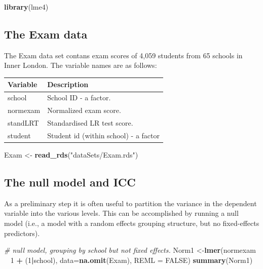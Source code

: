 \documentclass[]{book}
\newenvironment{Shaded}{\begin{snugshade}}{\end{snugshade}}
\newcommand{\KeywordTok}[1]{\textcolor[rgb]{0.13,0.29,0.53}{\textbf{#1}}}
\newcommand{\DataTypeTok}[1]{\textcolor[rgb]{0.13,0.29,0.53}{#1}}
\newcommand{\DecValTok}[1]{\textcolor[rgb]{0.00,0.00,0.81}{#1}}
\newcommand{\StringTok}[1]{\textcolor[rgb]{0.31,0.60,0.02}{#1}}
\newcommand{\CommentTok}[1]{\textcolor[rgb]{0.56,0.35,0.01}{\textit{#1}}}
\newcommand{\OtherTok}[1]{\textcolor[rgb]{0.56,0.35,0.01}{#1}}
\newcommand{\OperatorTok}[1]{\textcolor[rgb]{0.81,0.36,0.00}{\textbf{#1}}}
\newcommand{\NormalTok}[1]{#1}
\begin{document}
\begin{Shaded}
\begin{Highlighting}[]
  \KeywordTok{library}\NormalTok{(lme4)}
\end{Highlighting}
\end{Shaded}

\subsection{The Exam data}\label{the-exam-data}

The Exam data set contans exam scores of 4,059 students from 65 schools
in Inner London. The variable names are as follows:

\begin{longtable}[]{@{}ll@{}}
\toprule
Variable & Description\tabularnewline
\midrule
\endhead
school & School ID - a factor.\tabularnewline
normexam & Normalized exam score.\tabularnewline
standLRT & Standardised LR test score.\tabularnewline
student & Student id (within school) - a factor\tabularnewline
\bottomrule
\end{longtable}

\begin{Shaded}
\begin{Highlighting}[]
\NormalTok{  Exam <-}\StringTok{ }\KeywordTok{read_rds}\NormalTok{(}\StringTok{"dataSets/Exam.rds"}\NormalTok{)}
\end{Highlighting}
\end{Shaded}

\subsection{The null model and ICC}\label{the-null-model-and-icc}

As a preliminary step it is often useful to partition the variance in
the dependent variable into the various levels. This can be accomplished
by running a null model (i.e., a model with a random effects grouping
structure, but no fixed-effects predictors).

\begin{Shaded}
\begin{Highlighting}[]
  \CommentTok{# null model, grouping by school but not fixed effects.}
\NormalTok{  Norm1 <-}\KeywordTok{lmer}\NormalTok{(normexam }\OperatorTok{~}\StringTok{ }\DecValTok{1} \OperatorTok{+}\StringTok{ }\NormalTok{(}\DecValTok{1}\OperatorTok{|}\NormalTok{school),}
                \DataTypeTok{data=}\KeywordTok{na.omit}\NormalTok{(Exam), }\DataTypeTok{REML =} \OtherTok{FALSE}\NormalTok{)}
  \KeywordTok{summary}\NormalTok{(Norm1)}
\end{Highlighting}
\end{Shaded}
\end{document}
